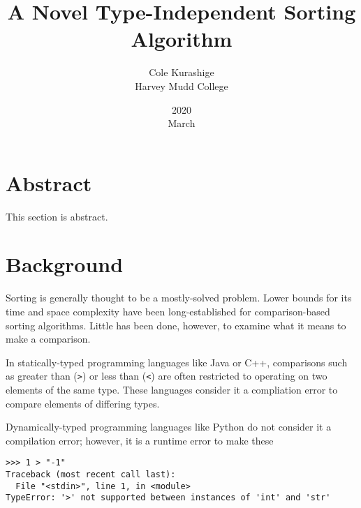 \documentclass{article}
\title{A Novel Type-Independent Sorting Algorithm}
\author{Cole Kurashige \\ Harvey Mudd College}
\date{2020 \\ March}
\begin{document}
\section{Abstract}
This section is abstract.

\section{Background}
Sorting is generally thought to be a mostly-solved problem. Lower bounds for
its time and space complexity have been long-established for comparison-based
sorting algorithms. Little has been done, however, to examine what it means to
make a comparison.

In statically-typed programming languages like Java or C++, comparisons such as
greater than (\texttt{>}) or less than (\texttt{<}) are often restricted to
operating on two elements of the same type. These languages consider it a
compliation error to compare elements of differing types.

Dynamically-typed programming languages like Python do not consider it a
compilation error; however, it is a runtime error to make these

\begin{lstlisting}[caption = Comparisons in Python 3.7.6]
>>> 1 > "-1"
Traceback (most recent call last):
  File "<stdin>", line 1, in <module>
TypeError: '>' not supported between instances of 'int' and 'str'
\end{lstlisting}
\end{document}
